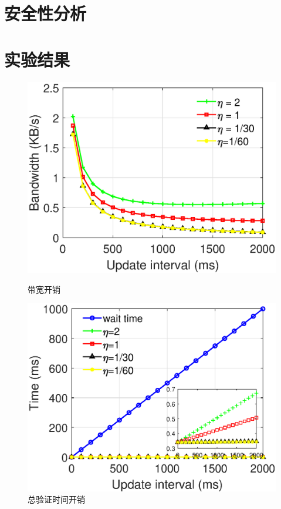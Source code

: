\section{安全性分析}

\section{实验结果}

\begin{figure}[ht]
  \begin{minipage}[b]{0.49\textwidth}
    \includegraphics[width= 3 in]{expr/bandwidth}
    \caption{带宽开销}
    \label{fig:bandwidth}
  \end{minipage}
  \begin{minipage}[b]{0.49\textwidth}
    \includegraphics[width= 3 in]{expr/verify-2}
    \caption{总验证时间开销}
    \label{fig:verify-2}
  \end{minipage}
\centering
\end{figure}


